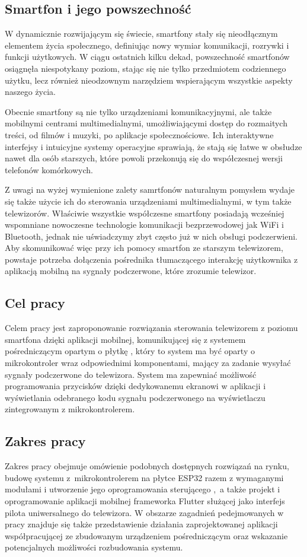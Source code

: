 \documentclass[12pt,twoside,draft]{article}
\begin{document}
\subsection{Smartfon i jego powszechność}
{W dynamicznie rozwijającym się świecie, smartfony stały się nieodłącznym elementem życia społecznego, 
definiując nowy wymiar komunikacji, rozrywki i funkcji użytkowych. 
W ciągu ostatnich kilku dekad, powszechność smartfonów osiągnęła niespotykany poziom, 
stając się nie tylko przedmiotem codziennego użytku, lecz również nieodzownym 
narzędziem wspierającym wszystkie aspekty naszego życia.

Obecnie smartfony są nie tylko urządzeniami komunikacyjnymi, ale także mobilnymi centrami multimedialnymi,
 umożliwiającymi dostęp do rozmaitych treści, od filmów i muzyki, po aplikacje społecznościowe. 
 Ich interaktywne interfejsy i intuicyjne systemy operacyjne sprawiają, że stają się łatwe w obsłudze nawet dla osób starszych, 
 które powoli przekonują się do współczesnej wersji telefonów komórkowych.

 Z uwagi na wyżej wymienione zalety samrtfonów naturalnym pomysłem wydaje się także użycie ich do 
 sterowania urządzeniami multimedialnymi, w tym także telewizorów. Właściwie wszystkie współczesne smartfony posiadają 
 wcześniej wspomniane nowoczesne technologie komunikacji bezprzewodowej jak WiFi i Bluetooth, jednak nie uświadczymy
 zbyt często już w nich obsługi podczerwieni. Aby skomunikować więc przy ich pomocy smartfon
 ze starszym telewizorem, powstaje potrzeba dołączenia pośrednika tłumaczącego interakcję 
 użytkownika z aplikacją mobilną na sygnały podczerwone, które zrozumie telewizor.}

\subsection{Cel pracy}
Celem pracy jest zaproponowanie rozwiązania sterowania telewizorem z poziomu 
smartfona dzięki aplikacji mobilnej, komunikującej się z systemem pośredniczącym opartym o płytkę , który to system ma być oparty o mikrokontroler wraz odpowiednimi komponentami, mający za zadanie wysyłać sygnały podczerwone do telewizora. System ma zapewniać możliwość programowania przycisków dzięki dedykowanemu ekranowi w aplikacji i 
wyświetlania odebranego kodu sygnału podczerwonego na wyświetlaczu zintegrowanym z mikrokontrolerem.
 
\subsection{Zakres pracy}
Zakres pracy obejmuje omówienie podobnych dostępnych rozwiązań na rynku, budowę systemu z~mikrokontrolerem na płytce ESP32 razem z wymaganymi modułami i utworzenie jego oprogramowania sterującego ,~a także projekt i oprogramowanie aplikacji
mobilnej frameworka Flutter służącej jako interfejs pilota uniwersalnego do telewizora. W obszarze zagadnień pedejmowanych w pracy znajduje się także przedstawienie działania zaprojektowanej aplikacji współpracującej ze zbudowanym urządzeniem pośredniczącym oraz wskazanie potencjalnych możliwości rozbudowania systemu.
\end{document}
